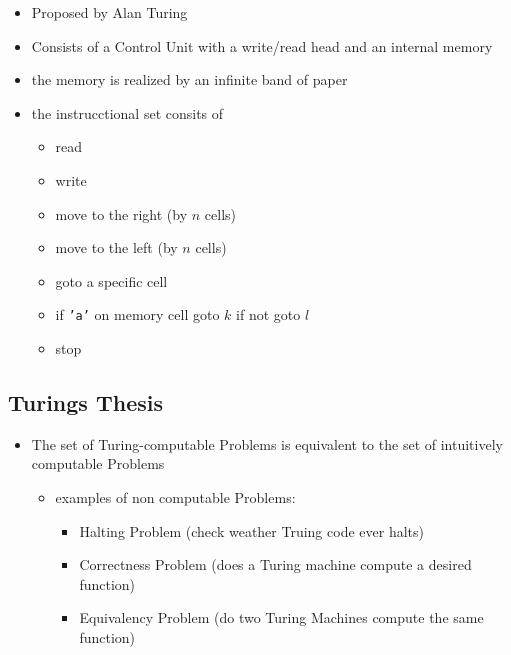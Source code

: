 \documentclass[a4paper]{article}
\begin{document}
\begin{itemize}
    \item Proposed by Alan Turing
    \item Consists of a Control Unit with a write/read head and an internal memory
    \item the memory is realized by an infinite band of paper
    \item the instrucctional set consits of
        \begin{itemize}
            \item read
            \item write
            \item move to the right (by $n$ cells)
            \item move to the left (by $n$ cells)
            \item goto a specific cell
            \item if \texttt{'a'} on memory cell goto $ k $ if not goto $ l $
            \item stop
        \end{itemize}
\end{itemize}

\subsection{Turings Thesis}

\begin{itemize}
    \item The set of Turing-computable Problems is equivalent to the set of intuitively computable Problems
        \begin{itemize}
            \item examples of non computable Problems:
                \begin{itemize}
                    \item Halting Problem (check weather Truing code ever halts)
                    \item Correctness Problem (does a Turing machine compute a desired function)
                    \item Equivalency Problem (do two Turing Machines compute the same function)
                \end{itemize}
        \end{itemize}
\end{itemize}
\end{document}
